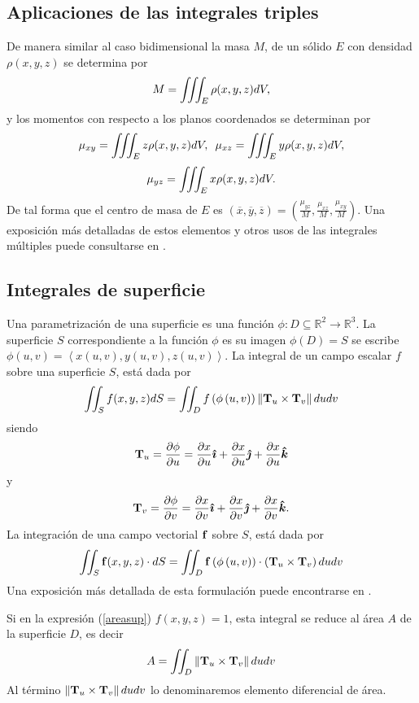 \subsection{Aplicaciones de las integrales triples}

De manera similar al caso bidimensional la masa $M$, de un sólido $E$ con densidad $\rho (x,y,z)$ se determina por
$$M=\displaystyle \iiint_E \rho (x,y,z) dV,$$ y los momentos con respecto a los planos coordenados se determinan por
$$\displaystyle \mu_{xy}=\iiint_E z\rho(x,y,z) dV,\,\,\, \mu_{xz}=\iiint_E y\rho(x,y,z) dV,$$
$$\displaystyle  \mu_{yz}=\iiint_E x\rho(x,y,z)dV.$$
De tal forma que el centro de masa de $E$ es
$(\overline{x},\overline{y},\overline{z})= (\frac{\mu_{yz}}{M}, \frac{\mu_{xz}}{M},\frac{\mu_{xy}}{M}) $.
Una exposición más detalladas de estos elementos y otros usos de las integrales múltiples puede consultarse en \cite{thomas_calculo_2015}.
\subsection{Integrales de superficie}
Una parametrización de una superficie es una función
$\phi:D\subseteq \mathbb{R}^{2}\rightarrow \mathbb{R}^{3}$.
La superficie $S$ correspondiente a la
función $\phi $ es su imagen $\phi \left( D\right) =S$ se escribe
$\phi(u,v)=\left\langle x\left( u,v\right) ,y\left( u,v\right),z\left( u,v\right) \right\rangle $.
La integral de un campo escalar $f$ sobre una superficie $S$,  está dada por
\begin{equation} \label{areasup}
\iint_{S}f(x,y,z) dS=\iint_{D}f\left( \phi \left( u,v\right)
\right) \left\| {\bf T}_{u}\times {\bf T}_{v}\right\| dudv
\end{equation}
siendo
$${\bf T}_{u}=\frac{\partial \phi }{\partial u}=\frac{\partial x}{\partial u}\boldsymbol{\hat{\imath}}+\frac{\partial x}{\partial u}\boldsymbol{\hat{\jmath}}+\frac{\partial x}{\partial u}\boldsymbol{\hat{k}}$$
y $${\bf T}_{v}=\frac{\partial \phi }{\partial v}=\frac{\partial x}{\partial v}\boldsymbol{\hat{\imath}}+\frac{\partial x}{\partial v}\boldsymbol{\hat{\jmath}}+\frac{\partial x}{\partial v}\boldsymbol{\hat{k}}.$$
La integración de una campo vectorial ${\bf f}$ sobre $S$, está dada por
\begin{equation}
\iint_{S} {\bf f}(x,y,z) \cdot dS=\iint_{D} {\bf f} \left( \phi \left(
u,v\right) \right) \cdot \left( {\bf T}_{u}\times {\bf T}_{v}\right) dudv
\end{equation}
Una exposición más detallada de esta formulación puede encontrarse en \cite{marsden_calculo_2013}.

Si en la expresión (\ref{areasup}) $f(x,y,z)=1$, esta integral se reduce al área $A$ de la superficie $D$, es decir
\begin{equation}
A=\iint_{D} \left\| {\bf T}_{u}\times {\bf T}_{v}\right\| dudv \label{areasup2}
\end{equation}
Al término $\left\| {\bf T}_{u}\times {\bf T}_{v}\right\|dudv$ lo denominaremos elemento diferencial de área.

